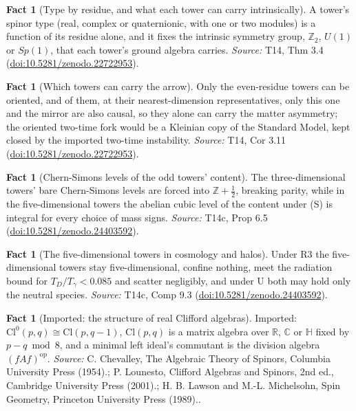 \documentclass[11pt]{article}
\theoremstyle{definition}
\newtheorem{fact}[theorem]{Fact}
\theoremstyle{plain}
\providecommand{\C}{}\renewcommand{\C}{\mathbb{C}}
\providecommand{\Cl}{}\renewcommand{\Cl}{\mathrm{Cl}}
\providecommand{\HH}{}\renewcommand{\HH}{\mathbb{H}}
\providecommand{\R}{}\renewcommand{\R}{\mathbb{R}}
\providecommand{\Z}{}\renewcommand{\Z}{\mathbb{Z}}
\begin{document}
\begin{fact}[Type by residue, and what each tower can carry intrinsically]\label{c:dark-matter.type-residue-what-each-tower-can}
A tower's spinor type (real, complex or quaternionic, with one or two modules) is a function of its residue alone, and it fixes the intrinsic symmetry group, $\Z_{2}$, $U(1)$ or $Sp(1)$, that each tower's ground algebra carries.
\emph{Source:} T14, Thm 3.4 (\href{https://doi.org/10.5281/zenodo.22722953}{doi:10.5281/zenodo.22722953}).
\end{fact}

\begin{fact}[Which towers can carry the arrow]\label{c:dark-matter.which-towers-can-carry-arrow}
Only the even-residue towers can be oriented, and of them, at their nearest-dimension representatives, only this one and the mirror are also causal, so they alone can carry the matter asymmetry; the oriented two-time fork would be a Kleinian copy of the Standard Model, kept closed by the imported two-time instability.
\emph{Source:} T14, Cor 3.11 (\href{https://doi.org/10.5281/zenodo.22722953}{doi:10.5281/zenodo.22722953}).
\end{fact}

\begin{fact}[Chern-Simons levels of the odd towers' content]\label{c:dark-tower-matter.anomalies}
The three-dimensional towers' bare Chern-Simons levels are forced into $\mathbb{Z} + \tfrac12$, breaking parity, while in the five-dimensional towers the abelian cubic level of the content under (S) is integral for every choice of mass signs.
\emph{Source:} T14c, Prop 6.5 (\href{https://doi.org/10.5281/zenodo.24403592}{doi:10.5281/zenodo.24403592}).
\end{fact}

\begin{fact}[The five-dimensional towers in cosmology and halos]\label{c:dark-tower-matter.five-dimensional-towers}
Under R3 the five-dimensional towers stay five-dimensional, confine nothing, meet the radiation bound for $T_D/T_\gamma < 0.085$ and scatter negligibly, and under U both may hold only the neutral species.
\emph{Source:} T14c, Comp 9.3 (\href{https://doi.org/10.5281/zenodo.24403592}{doi:10.5281/zenodo.24403592}).
\end{fact}

\begin{fact}[Imported: the structure of real Clifford algebras]\label{c:dark-tower-matter.imported-clifford-structure}
Imported: $\Cl^0(p,q) \cong \Cl(p,q-1)$, $\Cl(p,q)$ is a matrix algebra over $\R$, $\C$ or $\HH$ fixed by $p - q \bmod 8$, and a minimal left ideal's commutant is the division algebra $(fAf)^{\mathrm{op}}$.
\emph{Source:} C. Chevalley, The Algebraic Theory of Spinors, Columbia University Press (1954).; P. Lounesto, Clifford Algebras and Spinors, 2nd ed., Cambridge University Press (2001).; H. B. Lawson and M.-L. Michelsohn, Spin Geometry, Princeton University Press (1989)..
\end{fact}
\end{document}
